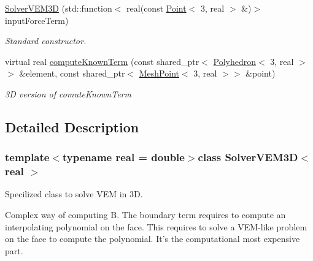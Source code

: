 \begin{DoxyCompactItemize}
\item 
\hypertarget{class_solver_v_e_m3_d_ab47c381f6c5708f5d6874f7b22c8d0d9}{\hyperlink{class_solver_v_e_m3_d_ab47c381f6c5708f5d6874f7b22c8d0d9}{\-Solver\-V\-E\-M3\-D} (std\-::function$<$ real(const \hyperlink{class_point}{\-Point}$<$ 3, real $>$ \&)$>$ input\-Force\-Term)}\label{class_solver_v_e_m3_d_ab47c381f6c5708f5d6874f7b22c8d0d9}

\begin{DoxyCompactList}\small\item\em \-Standard constructor. \end{DoxyCompactList}\item 
virtual real \hyperlink{class_solver_v_e_m3_d_ae11471f960f7c4677778dd52d8ce1bd5}{compute\-Known\-Term} (const shared\-\_\-ptr$<$ \hyperlink{class_polyhedron}{\-Polyhedron}$<$ 3, real $>$$>$ \&element, const shared\-\_\-ptr$<$ \hyperlink{class_mesh_point}{\-Mesh\-Point}$<$ 3, real $>$$>$ \&point)
\begin{DoxyCompactList}\small\item\em 3\-D version of comute\-Known\-Term \end{DoxyCompactList}\end{DoxyCompactItemize}


\subsection{\-Detailed \-Description}
\subsubsection*{template$<$typename real = double$>$class Solver\-V\-E\-M3\-D$<$ real $>$}

\-Specilized class to solve \-V\-E\-M in 3\-D. 

\-Complex way of computing \-B. \-The boundary term requires to compute an interpolating polynomial on the face. \-This requires to solve a \-V\-E\-M-\/like problem on the face to compute the polynomial. \-It's the computational most expensive part. 


